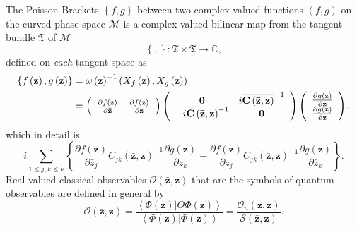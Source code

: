 \documentclass[aps,preprint]{revtex4}%
\begin{document}
The Poisson Brackets $\left\{  f,g\right\}  $ between two complex valued
functions $\left(  f,g\right)  $ on the curved phase space $\mathcal{M}$ is a
complex valued bilinear map from the tangent bundle $\mathfrak{T}$ of
$\mathcal{M}$
\begin{equation}
\left\{  ,\right\}  :\mathfrak{T}\times\mathfrak{T}\rightarrow\mathbb{C},
\end{equation}
defined on \emph{each} tangent space as
\begin{align}
\left\{  f\left(  \mathbf{z}\right)  ,g\left(  \mathbf{z}\right)  \right\}
&  =\omega\left(  \mathbf{z}\right)  ^{-1}\left(  X_{f}\left(  \mathbf{z}%
\right)  ,X_{g}\left(  \mathbf{z}\right)  \right) \nonumber\\
&  =\left(
\begin{array}
[c]{cc}%
\frac{\partial f\left(  \mathbf{z}\right)  }{\partial\mathbf{\bar{z}}} &
\frac{\partial f\left(  \mathbf{z}\right)  }{\partial\mathbf{z}}%
\end{array}
\right)  \left(
\begin{array}
[c]{cc}%
\mathbf{0} & i\overline{\mathbf{C}\left(  \mathbf{\bar{z},z}\right)  }^{-1}\\
-i\mathbf{C}\left(  \mathbf{\bar{z},z}\right)  ^{-1} & \mathbf{0}%
\end{array}
\right)  \left(
\begin{array}
[c]{c}%
\frac{\partial g\left(  \mathbf{z}\right)  }{\partial\mathbf{\bar{z}}}\\
\frac{\partial g\left(  \mathbf{z}\right)  }{\partial\mathbf{z}}%
\end{array}
\right)  . \label{PB}%
\end{align}
which in detail is
\begin{equation}
i\sum_{1\leq j,k\leq\nu}\left\{  \frac{\partial f\left(  \mathbf{z}\right)
}{\partial\bar{z}_{j}}\overline{C_{jk}\left(  \mathbf{\bar{z},z}\right)
}^{-1}\frac{\partial g\left(  \mathbf{z}\right)  }{\partial z_{k}}%
-\frac{\partial f\left(  \mathbf{z}\right)  }{\partial z_{j}}C_{jk}\left(
\mathbf{\bar{z},z}\right)  ^{-1}\frac{\partial g\left(  \mathbf{z}\right)
}{\partial\bar{z}_{k}}\right\}  .
\end{equation}
Real valued classical observables $\mathcal{O}\left(  \mathbf{\bar{z}%
,z}\right)  $ that are the symbols of quantum observables are defined in
general by
\begin{equation}
\mathcal{O}\left(  \mathbf{\bar{z},z}\right)  =\frac{\left\langle \left.
\Phi\left(  \mathbf{z}\right)  \right\vert O\Phi\left(  \mathbf{z}\right)
\right\rangle }{\left\langle \left.  \Phi\left(  \mathbf{z}\right)
\right\vert \Phi\left(  \mathbf{z}\right)  \right\rangle }=\frac
{\mathcal{O}_{u}\left(  \mathbf{\bar{z},z}\right)  }{\mathcal{S}\left(
\mathbf{\bar{z},z}\right)  }.
\end{equation}
\end{document}
